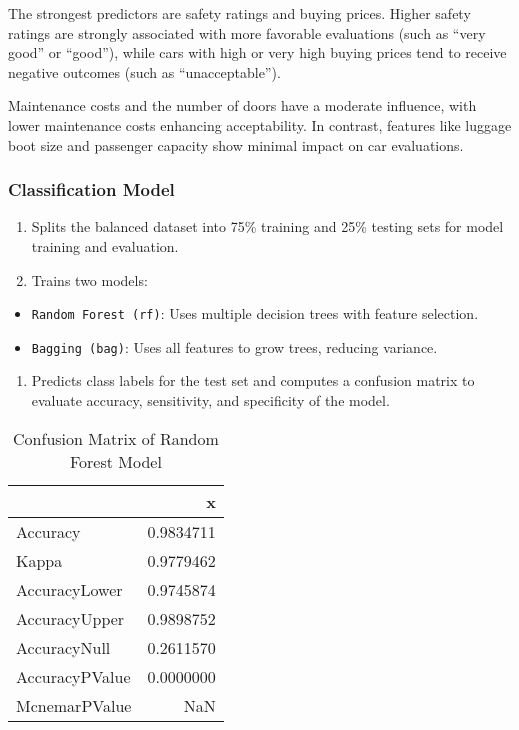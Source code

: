 \documentclass[
  letterpaper,
  DIV=11,
  numbers=noendperiod]{scrartcl}
\providecommand{\tightlist}{%
  \setlength{\itemsep}{0pt}\setlength{\parskip}{0pt}}\usepackage{longtable,booktabs,array}
\begin{document}
The strongest predictors are safety ratings and buying prices. Higher
safety ratings are strongly associated with more favorable evaluations
(such as ``very good'' or ``good''), while cars with high or very high
buying prices tend to receive negative outcomes (such as
``unacceptable'').

Maintenance costs and the number of doors have a moderate influence,
with lower maintenance costs enhancing acceptability. In contrast,
features like luggage boot size and passenger capacity show minimal
impact on car evaluations.

\subsubsection{Classification Model}\label{classification-model}

\begin{enumerate}
\def\labelenumi{\arabic{enumi}.}
\item
  Splits the balanced dataset into 75\% training and 25\% testing sets
  for model training and evaluation.
\item
  Trains two models:
\end{enumerate}

\begin{itemize}
\item
  \texttt{Random\ Forest\ (rf)}: Uses multiple decision trees with
  feature selection.
\item
  \texttt{Bagging\ (bag)}: Uses all features to grow trees, reducing
  variance.
\end{itemize}

\begin{enumerate}
\def\labelenumi{\arabic{enumi}.}
\setcounter{enumi}{2}
\tightlist
\item
  Predicts class labels for the test set and computes a confusion matrix
  to evaluate accuracy, sensitivity, and specificity of the model.
\end{enumerate}

\begin{longtable}[]{@{}lr@{}}

\caption{\label{tbl-overall_confusion_matrix}Confusion Matrix of Random
Forest Model}

\tabularnewline

\toprule\noalign{}
& x \\
\midrule\noalign{}
\endhead
\bottomrule\noalign{}
\endlastfoot
Accuracy & 0.9834711 \\
Kappa & 0.9779462 \\
AccuracyLower & 0.9745874 \\
AccuracyUpper & 0.9898752 \\
AccuracyNull & 0.2611570 \\
AccuracyPValue & 0.0000000 \\
McnemarPValue & NaN \\

\end{longtable}
\end{document}

